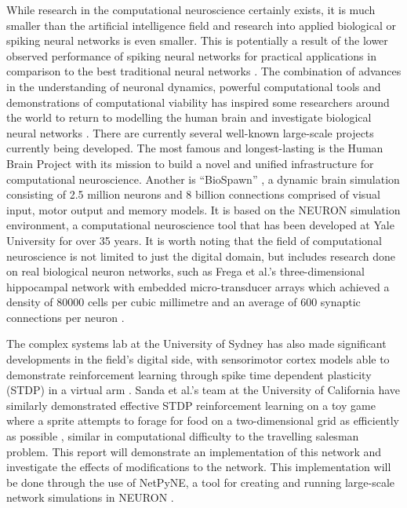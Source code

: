 \documentclass[11pt, twocolumn]{article}
\begin{document}
While research in the computational neuroscience certainly exists, it is much smaller than the artificial intelligence field and research into applied biological or spiking neural networks is even smaller. This is potentially a result of the lower observed performance of spiking neural networks for practical applications in comparison to the best traditional neural networks \cite{schmidhuber2015deep}. The combination of advances in the understanding of neuronal dynamics, powerful computational tools and demonstrations of computational viability \cite{zenke2014limits} has inspired some researchers around the world to return to modelling the human brain and investigate biological neural networks \cite{ashby2011tutorial}\cite{ashby2005frost}\cite{frank2005dynamic}\cite{hartley2006understanding}\cite{leveille2010running}. There are currently several well-known large-scale projects currently being developed. The most famous and longest-lasting is the Human Brain Project \cite{markram2015reconstruction} with its mission to build a novel and unified infrastructure for computational neuroscience. Another is ``BioSpawn'' \cite{eliasmith2016biospaun}, a dynamic brain simulation consisting of 2.5 million neurons and 8 billion connections comprised of visual input, motor output and memory models. It is based on the \acs{NEURON} simulation environment, a computational neuroscience tool that has been developed at Yale University for over 35 years. It is worth noting that the field of computational neuroscience is not limited to just the digital domain, but includes research done on real biological neuron networks, such as Frega et al.'s three-dimensional hippocampal network with embedded micro-transducer arrays which achieved a density of 80000 cells per cubic millimetre and an average of 600 synaptic connections per neuron \cite{frega2014network}.

The complex systems lab at the University of Sydney has also made significant developments in the field's digital side, with sensorimotor cortex models able to demonstrate reinforcement learning through spike time dependent plasticity (\acs{STDP}) in a virtual arm \cite{neymotin2013reinforcement}\cite{dura2017evolutionary}. Sanda et al.'s team at the University of California have similarly demonstrated effective \acs{STDP} reinforcement learning on a toy game where a sprite attempts to forage for food on a two-dimensional grid as efficiently as possible \cite{sanda2017multi}, similar in computational difficulty to the travelling salesman problem. This report will demonstrate an implementation of this network and investigate the effects of modifications to the network. This implementation will be done through the use of \acs{NetPyNE}, a tool for creating and running large-scale network simulations in \acs{NEURON} \cite{dura2018netpyne}.
\end{document}
